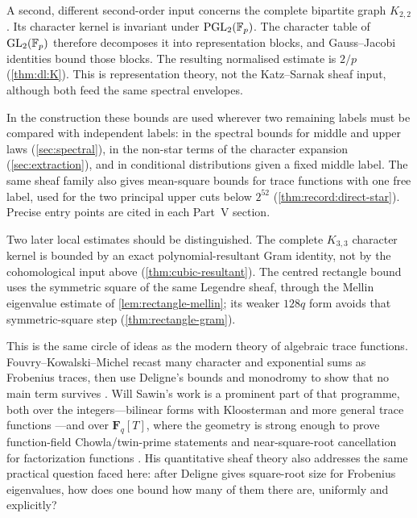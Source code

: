 A second, different second-order input concerns the complete bipartite
graph $K_{2,2}$. Its character kernel is invariant under
$\mathrm{PGL}_2(\mathbb F_p)$. The character table of $\mathrm{GL}_2(\mathbb F_p)$
therefore decomposes it into representation blocks, and Gauss--Jacobi
identities bound those blocks. The resulting normalised estimate is $2/p$
(\cref{thm:dl:K}). This is representation theory, not the Katz--Sarnak
sheaf input, although both feed the same spectral envelopes.

In the construction these bounds are used wherever two remaining
labels must be compared with independent labels: in the spectral
bounds for middle and upper laws (\cref{sec:spectral}), in the
non-star terms of the character expansion
(\cref{sec:extraction}), and in conditional distributions given a
fixed middle label. The same sheaf family also gives mean-square
bounds for trace functions with one free label, used for the two
principal upper cuts below $2^{52}$
(\cref{thm:record:direct-star}). Precise entry points are cited in
each Part~V section.

Two later local estimates should be distinguished. The complete
$K_{3,3}$ character kernel is bounded by an exact polynomial-resultant
Gram identity, not by the cohomological input above
(\cref{thm:cubic-resultant}). The centred rectangle bound uses the
symmetric square of the same Legendre sheaf, through the Mellin
eigenvalue estimate of \cref{lem:rectangle-mellin}; its weaker
$128q$ form avoids that symmetric-square step
(\cref{thm:rectangle-gram}).

This is the same circle of ideas as the modern theory of algebraic
trace functions. Fouvry--Kowalski--Michel recast many character and
exponential sums as Frobenius traces, then use Deligne's bounds and
monodromy to show that no main term survives
\cite{FKMPrimes14,FKMTwists15}. Will Sawin's work is a prominent part
of that programme, both over the integers---bilinear forms with
Kloosterman and more general trace functions
\cite{KMS17,KMS20,FKMSBilinearTrace25}---and over
$\mathbf F_q[T]$, where the geometry is strong enough to prove
function-field Chowla/twin-prime statements and near-square-root
cancellation for factorization functions
\cite{SawinShusterman22,SawinFactorization24,KowalskiBourbakiSawinShusterman}.
His quantitative sheaf theory \cite{SawinQST23} also addresses the
same practical question faced here: after Deligne gives square-root
size for Frobenius eigenvalues, how does one bound how many of them
there are, uniformly and explicitly?

